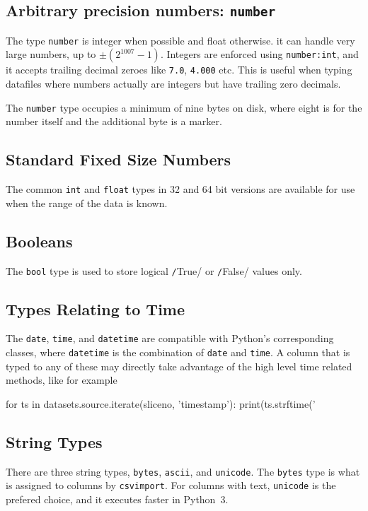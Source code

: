 
\subsection{Arbitrary precision numbers:  \texttt{number}}
The type \texttt{number} is integer when possible and float otherwise.
it can handle very large numbers, up to $\pm (2^{1007}-1)$.  Integers
are enforced using \texttt{number:int}, and it accepts trailing
decimal zeroes like \texttt{7.0}, \texttt{4.000} etc.  This is useful
when typing datafiles where numbers actually are integers but have
trailing zero decimals.

The \texttt{number} type occupies a minimum of nine bytes on disk,
where eight is for the number itself and the additional byte is a
marker.


\subsection{Standard Fixed Size Numbers}
The common \texttt{int} and \texttt{float} types in 32 and 64 bit
versions are available for use when the range of the data is known.


\subsection{Booleans}
The \texttt{bool} type is used to store logical
\texttt/True/ or \texttt/False/ values only.


\subsection{Types Relating to Time}
The \texttt{date}, \texttt{time}, and \texttt{datetime} are compatible
with Python's corresponding classes, where \texttt{datetime} is the
combination of \texttt{date} and \texttt{time}.  A column that is
typed to any of these may directly take advantage of the high level
time related methods, like for example
\begin{python}
for ts in datasets.source.iterate(sliceno, 'timestamp'):
    print(ts.strftime('%
\end{python}


\subsection{String Types}
There are three string types, \texttt{bytes}, \texttt{ascii}, and
\texttt{unicode}.  The \texttt{bytes} type is what is assigned to
columns by \texttt{csvimport}.  For columns with text,
\texttt{unicode} is the prefered choice, and it executes faster in
Python~3.


